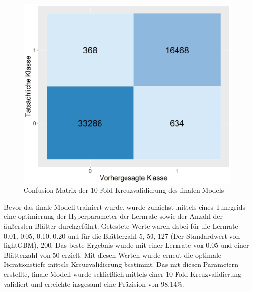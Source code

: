 \begin{figure}[h]
    \centering
    \includegraphics[scale=0.45]{graphics/confusion_matrix.jpg}
    \caption{Confusion-Matrix der 10-Fold Kreuzvalidierung des finalen Models}
    \label{confusion-table}
\end{figure}


Bevor das finale Modell trainiert wurde, wurde zunächst mittels eines Tunegrids eine optimierung der Hyperparameter der Lernrate sowie der Anzahl der äußersten Blätter durchgeführt.
Getestete Werte waren dabei für die Lernrate 0.01, 0.05, 0.10, 0.20 und für die Blätterzahl 5, 50, 127 (Der Standardwert von lightGBM), 200.
Das beste Ergebnis wurde mit einer Lernrate von 0.05 und einer Blätterzahl von 50 erzielt.
Mit diesen Werten wurde erneut die optimale Iterationstiefe mittels Kreuzvalidierung bestimmt.
Das mit diesen Parametern erstellte, finale Modell wurde schließlich mittels einer 10-Fold Kreuzvalidierung validiert und erreichte insgesamt eine Präzision von 98.14\%.

